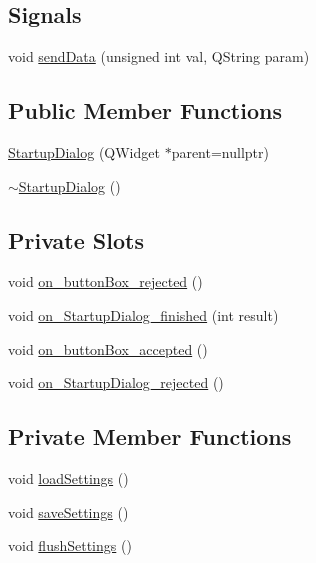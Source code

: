\subsection*{Signals}
\begin{DoxyCompactItemize}
\item 
void \mbox{\hyperlink{class_startup_dialog_a46bdde0c52c20bbcc06a48bfa25df5db}{send\+Data}} (unsigned int val, Q\+String param)
\end{DoxyCompactItemize}
\subsection*{Public Member Functions}
\begin{DoxyCompactItemize}
\item 
\mbox{\hyperlink{class_startup_dialog_a720174c5233d6b33f5d65b9c404b4445}{Startup\+Dialog}} (Q\+Widget $\ast$parent=nullptr)
\item 
\mbox{\hyperlink{class_startup_dialog_a21e41329a66a0ceb4aae21baba78bd0d}{$\sim$\+Startup\+Dialog}} ()
\end{DoxyCompactItemize}
\subsection*{Private Slots}
\begin{DoxyCompactItemize}
\item 
void \mbox{\hyperlink{class_startup_dialog_a7aee3b6219d164760589c51aa7989bad}{on\+\_\+button\+Box\+\_\+rejected}} ()
\item 
void \mbox{\hyperlink{class_startup_dialog_a5d6aa20d81bc223b2e9931811b2aca95}{on\+\_\+\+Startup\+Dialog\+\_\+finished}} (int result)
\item 
void \mbox{\hyperlink{class_startup_dialog_acf772dfd42cfc24f058372cb6ee3ae24}{on\+\_\+button\+Box\+\_\+accepted}} ()
\item 
void \mbox{\hyperlink{class_startup_dialog_a49bcc6d2a28e82654ab583aba08f0ba5}{on\+\_\+\+Startup\+Dialog\+\_\+rejected}} ()
\end{DoxyCompactItemize}
\subsection*{Private Member Functions}
\begin{DoxyCompactItemize}
\item 
void \mbox{\hyperlink{class_startup_dialog_a931800d2e42ff7172a2245252f04c622}{load\+Settings}} ()
\item 
void \mbox{\hyperlink{class_startup_dialog_a2c474c7787e0ea42958cb48f12f4e5c7}{save\+Settings}} ()
\item 
void \mbox{\hyperlink{class_startup_dialog_a59d1dc04138b5f7d53ca0b819a61068e}{flush\+Settings}} ()
\end{DoxyCompactItemize}
